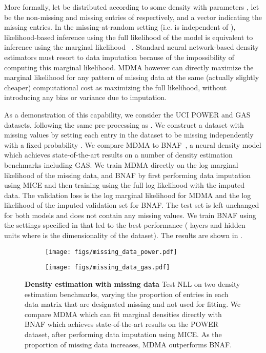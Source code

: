 \documentclass{article}
\begin{document}
More formally, let  be distributed according to some density  with parameters ,  let  be the non-missing and missing entries of  respectively, and  a vector indicating the missing entries. 
In the missing-at-random setting (i.e.  is independent of ), 
likelihood-based inference using the full likelihood of the model is equivalent to inference using the marginal likelihood~\cite{little2019} .
Standard neural network-based density estimators 
must resort to data imputation because
of the impossibility of computing this marginal likelihood.
MDMA however can directly maximize the marginal likelihood for any pattern of missing data at the same (actually slightly cheaper) computational cost as maximizing the full likelihood, without introducing any bias or variance due to imputation. 


As a demonstration of this capability, we consider the UCI POWER and GAS datasets, following the same pre-processing as \cite{papamakarios2017masked}. We construct a dataset with missing values by setting each entry in the dataset to be missing independently with a fixed probability . We compare MDMA to BNAF~\cite{de2020block}, a neural density model which achieves state-of-the-art results on a number of density estimation benchmarks including GAS. We train MDMA directly on the log marginal likelihood of the missing data, and BNAF by first performing data imputation using MICE \cite{buuren2010mice} and then training using the full log likelihood with the imputed data. The validation loss is the log marginal likelihood for MDMA and the log likelihood of the imputed validation set for BNAF. The test set is left unchanged for both models and does not contain any missing values. We train BNAF using the settings specified in \cite{de2020block} that led to the best performance ( layers and  hidden units where  is the dimensionality of the dataset). The results are shown in . 
\begin{figure}
\vspace{-.2in}
  \begin{subfigure}[b]{0.5\textwidth}
    \centering
    \texttt{[image: figs/missing\_data\_power.pdf]}
  \end{subfigure}
    \begin{subfigure}[b]{0.5\textwidth}
    \centering
    \texttt{[image: figs/missing\_data\_gas.pdf]}
  \end{subfigure}
    \caption{\textbf{Density estimation with missing data} Test NLL on two density estimation benchmarks, varying the proportion of entries in each data matrix that are designated missing and not used for fitting. We compare MDMA which can fit marginal densities directly with BNAF which achieves state-of-the-art results on the POWER dataset, after performing data imputation using MICE. As the proportion of missing data increases, MDMA outperforms BNAF.}
    \label{fig:missing_data}
\end{figure}
\end{document}

